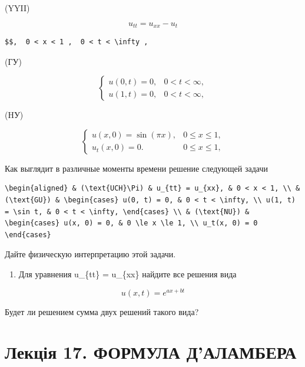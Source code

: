 \documentclass[
  ukrainian,
]{article}
\providecommand{\tightlist}{%
  \setlength{\itemsep}{0pt}\setlength{\parskip}{0pt}}
\begin{document}
(YYII)

\[
u_{tt} = u_{xx} - u_t
\]

\begin{verbatim}
$$,  0 < x < 1 ,  0 < t < \infty ,
\end{verbatim}

(ГУ)

\[
\begin{cases} u(0, t) = 0, & 0 < t < \infty, \\ u(1, t) = 0, & 0 < t < \infty, \end{cases}
\]

(HУ)

\[
\begin{cases} u(x, 0) = \sin(\pi x), & 0 \le x \le 1, \\ u_t(x, 0) = 0. & 0 \le x \le 1, \end{cases}
\]

Как выглядит в различные моменты времени решение следующей задачи

\begin{verbatim}
\begin{aligned} & (\text{UCH}\Pi) & u_{tt} = u_{xx}, & 0 < x < 1, \\ & (\text{GU}) & \begin{cases} u(0, t) = 0, & 0 < t < \infty, \\ u(1, t) = \sin t, & 0 < t < \infty, \end{cases} \\ & (\text{NU}) & \begin{cases} u(x, 0) = 0, & 0 \le x \le 1, \\ u_t(x, 0) = 0 \end{cases}
\end{verbatim}

Дайте физическую интерпретацию этой задачи.

\begin{enumerate}
\def\labelenumi{\arabic{enumi}.}
\setcounter{enumi}{3}
\tightlist
\item
  Для уравнения u\_\{tt\} = u\_\{xx\} найдите все решения вида
\end{enumerate}

\[
u(x, t) = e^{ax+bt}
\]

Будет ли решением сумма двух решений такого вида?

\section{Лекція 17. ФОРМУЛА
Д'АЛАМБЕРА}\label{ux43bux435ux43aux446ux456ux44f-17.-ux444ux43eux440ux43cux443ux43bux430-ux434ux430ux43bux430ux43cux431ux435ux440ux430}
\end{document}
